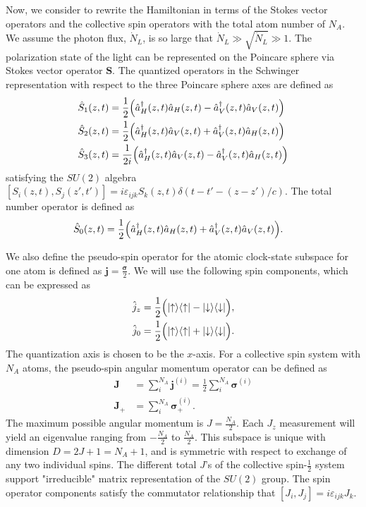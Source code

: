 \documentclass[preprint,aps,pra,onecolumn]{revtex4-1} %
\begin{document}
Now, we consider to rewrite the Hamiltonian in terms of the Stokes vector operators and the collective spin operators with the total atom number of $ N_A $. We assume the photon flux, $ \dot{N}_L $, is so large that $ \dot{N}_L\gg \sqrt{\dot{N}_L}\gg 1 $. 
The polarization state of the light can be represented on the Poincare sphere via Stokes vector operator $ \mathbf{S} $. The quantized operators in the Schwinger representation with respect to the three Poincare sphere axes are defined as  
\begin{align}
\hat{S}_1(z,t)&= \frac{1}{2} \Big( \hat{a}_H^\dagger(z,t) \hat{a}_H(z,t) -  \hat{a}_V^\dagger(z,t) \hat{a}_V(z,t) \Big) \\
\hat{S}_2(z,t)&= \frac{1}{2} \Big( \hat{a}_H^\dagger(z,t) \hat{a}_V(z,t) +  \hat{a}_V^\dagger(z,t) \hat{a}_H(z,t) \Big)\\
\hat{S}_3(z,t)&= \frac{1}{2i} \Big( \hat{a}_H^\dagger(z,t) \hat{a}_V(z,t) -  \hat{a}_V^\dagger(z,t) \hat{a}_H(z,t) \Big)
\end{align}
satisfying the $ SU(2) $ algebra $ [S_i(z,t),S_j(z',t')]=i\varepsilon_{ijk}S_k(z,t)\delta (t-t' - (z-z')/c ) $. The total number operator is defined as
\begin{align}
\hat{S}_0(z,t)&= \frac{1}{2} \Big( \hat{a}_H^\dagger(z,t) \hat{a}_H(z,t) +  \hat{a}_V^\dagger(z,t) \hat{a}_V(z,t) \Big).
\end{align}

We also define the pseudo-spin operator for the atomic clock-state subspace for one atom is defined as $ \mathbf{j}=\frac{\boldsymbol{\sigma}}{2} $. We will use  the following spin components, which can be expressed as
\begin{align}
\hat{j}_z &= \frac{1}{2} \Big( \lvert{\uparrow}\rangle\langle{\uparrow}\rvert - \lvert{\downarrow}\rangle\langle{\downarrow}\rvert  \Big), \\
\hat{j}_0 &= \frac{1}{2} \Big( \lvert{\uparrow}\rangle\langle{\uparrow}\rvert + \lvert{\downarrow}\rangle\langle{\downarrow}\rvert  \Big).
\end{align}
The quantization axis is chosen to be the $ x $-axis. For a collective spin system with $ N_A $ atoms, the pseudo-spin angular momentum operator can be defined as
\begin{align}
\mathbf{J} &=\sum_i^{N_A}\mathbf{j}^{(i)}=\frac{1}{2}\sum_i^{N_A} \boldsymbol{\sigma}^{(i)}\\
\mathbf{J}_+ &=\sum_i^{N_A} \boldsymbol{\sigma}^{(i)}_+.
\end{align}
The maximum possible angular momentum is $ J=\frac{N_A}{2} $. Each $ J_z $ measurement will yield an eigenvalue ranging from $ -\frac{N_A}{2} $ to $ \frac{N_A}{2} $.  This subspace is unique with dimension $ D=2J+1=N_A+1 $, and is symmetric with respect to exchange of any two individual spins. The different total $ J $'s of the collective spin-$ \frac{1}{2} $ system support "irreducible" matrix representation of the $ SU(2) $ group. The spin operator components satisfy the commutator relationship that $ [J_i,J_j]=i\varepsilon_{ijk}J_k $. 
\end{document}
